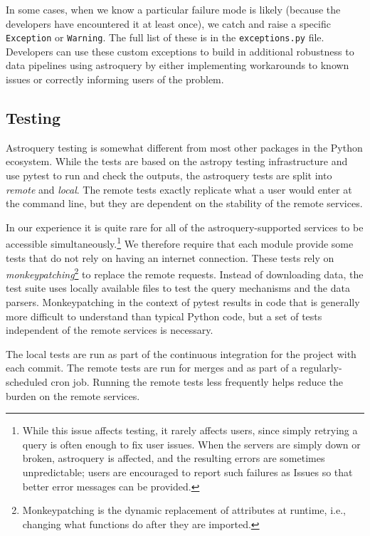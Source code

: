 \documentclass[twocolumn]{aastex62}
\begin{document}
In some cases, when we know a particular failure mode is likely (because the
developers have encountered it at least once), we catch and raise a specific
\texttt{Exception} or \texttt{Warning}.  The full list of these is in the
\texttt{exceptions.py} file.  Developers can use these custom exceptions
to build in additional robustness to data pipelines using astroquery
by either implementing workarounds to known issues or correctly informing
users of the problem.

\subsection{Testing}
Astroquery testing is somewhat different from most other packages in the Python
ecosystem.  While the tests are based on the astropy testing infrastructure and use
pytest to run and check the outputs, the astroquery tests are split into
\emph{remote} and \emph{local}.  The remote tests exactly replicate what a user
would enter at the command line, but they are dependent on the stability of the
remote services.

In our experience it is quite rare for all of the astroquery-supported
services to be accessible simultaneously.\footnote{While this issue affects
testing, it rarely affects users, since simply retrying a query is often
enough to fix user issues.  When the servers are simply down or broken,
astroquery is affected, and the resulting errors are sometimes unpredictable;
users are encouraged to report such failures as Issues so that better error
messages can be provided.} We therefore require that each
module provide some tests that do not rely on having an internet connection.
These tests rely on \emph{monkeypatching}\footnote{Monkeypatching is the
  dynamic replacement of attributes at runtime, i.e., changing what
  functions do after they are imported.} to replace the remote
requests. Instead of downloading data, the test suite uses locally available
files to test the query mechanisms and the data parsers.  Monkeypatching in
the context of pytest results in code that is generally more
difficult to understand than typical Python code, but a set of tests
independent of the remote services is necessary.

The local tests are run as part of the continuous integration for the
project with each commit.  The remote tests are run for merges and as part of a
regularly-scheduled cron job.  Running the remote tests less frequently
helps reduce the burden on the remote services.
\end{document}
